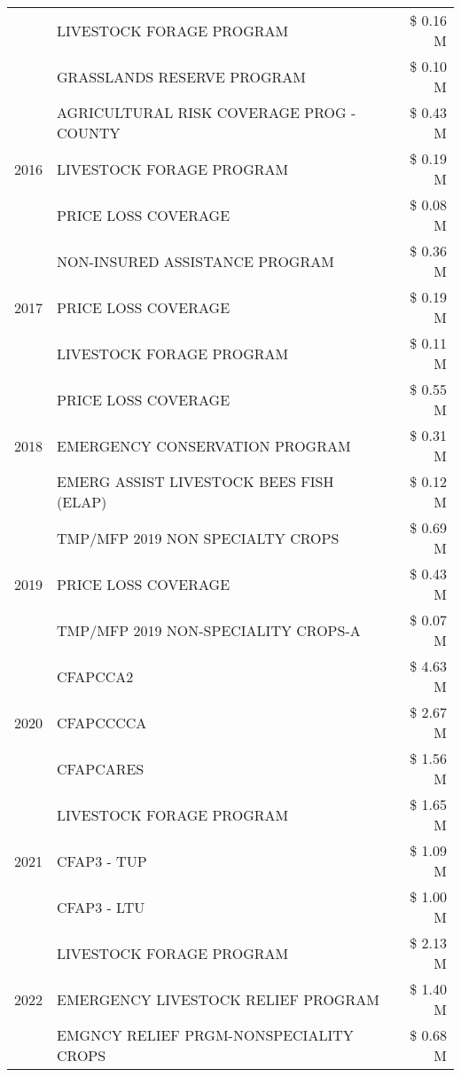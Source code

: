 \begin{tabular}{llr}
 & LIVESTOCK FORAGE PROGRAM & \$ 0.16 M \\
 & GRASSLANDS RESERVE PROGRAM & \$ 0.10 M \\
\cline{1-3}
\multirow[t]{3}{*}{2016} & AGRICULTURAL RISK COVERAGE PROG - COUNTY & \$ 0.43 M \\
 & LIVESTOCK FORAGE PROGRAM & \$ 0.19 M \\
 & PRICE LOSS COVERAGE & \$ 0.08 M \\
\cline{1-3}
\multirow[t]{3}{*}{2017} & NON-INSURED ASSISTANCE PROGRAM & \$ 0.36 M \\
 & PRICE LOSS COVERAGE & \$ 0.19 M \\
 & LIVESTOCK FORAGE PROGRAM & \$ 0.11 M \\
\cline{1-3}
\multirow[t]{3}{*}{2018} & PRICE LOSS COVERAGE & \$ 0.55 M \\
 & EMERGENCY CONSERVATION PROGRAM & \$ 0.31 M \\
 & EMERG ASSIST LIVESTOCK BEES FISH (ELAP) & \$ 0.12 M \\
\cline{1-3}
\multirow[t]{3}{*}{2019} & TMP/MFP 2019 NON SPECIALTY CROPS & \$ 0.69 M \\
 & PRICE LOSS COVERAGE & \$ 0.43 M \\
 & TMP/MFP 2019 NON-SPECIALITY CROPS-A & \$ 0.07 M \\
\cline{1-3}
\multirow[t]{3}{*}{2020} & CFAPCCA2 & \$ 4.63 M \\
 & CFAPCCCCA & \$ 2.67 M \\
 & CFAPCARES & \$ 1.56 M \\
\cline{1-3}
\multirow[t]{3}{*}{2021} & LIVESTOCK FORAGE PROGRAM & \$ 1.65 M \\
 & CFAP3 - TUP & \$ 1.09 M \\
 & CFAP3 - LTU & \$ 1.00 M \\
\cline{1-3}
\multirow[t]{3}{*}{2022} & LIVESTOCK FORAGE PROGRAM & \$ 2.13 M \\
 & EMERGENCY LIVESTOCK RELIEF PROGRAM & \$ 1.40 M \\
 & EMGNCY RELIEF PRGM-NONSPECIALITY CROPS & \$ 0.68 M \\
\cline{1-3}
\bottomrule
\end{tabular}
